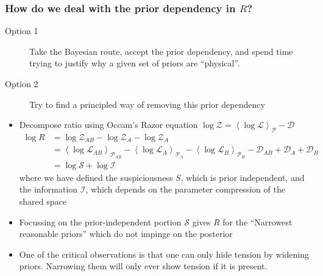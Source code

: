 \documentclass[aspectratio=169]{beamer}
\newcommand{\av}[2][]{\left\langle #2\right\rangle_{#1}}
\begin{document}
\begin{frame}
    \frametitle{How do we deal with the prior dependency in $R$?}
    \begin{description}
        \item[Option 1] Take the Bayesian route, accept the prior dependency, and spend time trying to justify why a given set of priors are ``physical''.
        \item[Option 2] Try to find a principled way of removing this prior dependency
    \end{description}
    \begin{itemize}
        \item Decompose ratio using Occam's Razor equation $\log \mathcal{Z} = \av[\mathcal{P}]{\log\mathcal{L}} - \mathcal{D}$
        \[ 
            \begin{aligned}
                \log R &= \log\mathcal{Z}_{AB} - \log\mathcal{Z}_{A} - \log\mathcal{Z}_{A} \\
                &= \av[\mathcal{P}_{AB}]{\log\mathcal{L}_{AB}} - \av[\mathcal{P}_{A}]{\log\mathcal{L}_{A}}- \av[\mathcal{P}_{B}]{\log\mathcal{L}_{B}} - \mathcal{D}_{AB} + \mathcal{D}_{A} + \mathcal{D}_{B} \\
                &= \log \mathcal{S} + \log \mathcal{I}
            \end{aligned}
    \]
    where we have defined the suspiciousness $S$, which is prior independent, and the information $\mathcal{I}$, which depends on the parameter compression of the shared space
        \item Focussing on the prior-independent portion $\mathcal{S}$ gives $R$ for the  ``Narrowest reasonable priors'' which do not impinge on the posterior
        \item One of the critical observations is that one can only hide tension by widening priors. Narrowing them will only ever show tension if it is present.
    \end{itemize}
\end{frame}
\end{document}

